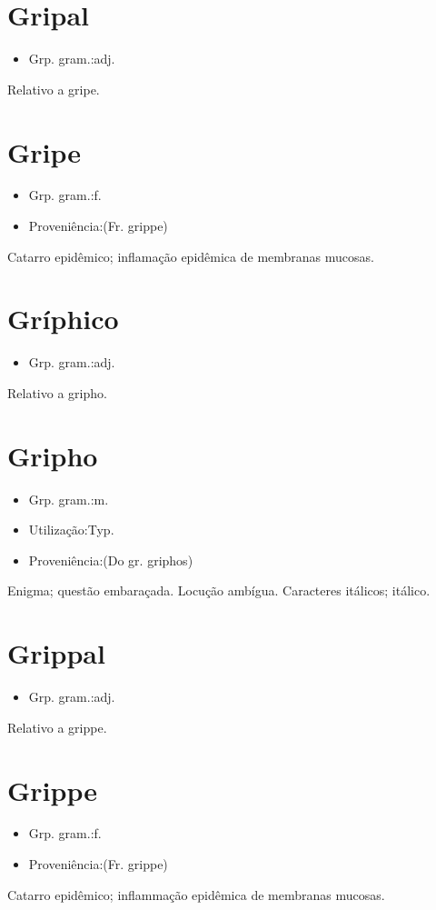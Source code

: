 \section{Gripal}
\begin{itemize}
\item {Grp. gram.:adj.}
\end{itemize}
Relativo a gripe.
\section{Gripe}
\begin{itemize}
\item {Grp. gram.:f.}
\end{itemize}
\begin{itemize}
\item {Proveniência:(Fr. \textunderscore grippe\textunderscore )}
\end{itemize}
Catarro epidêmico; inflamação epidêmica de membranas mucosas.
\section{Gríphico}
\begin{itemize}
\item {Grp. gram.:adj.}
\end{itemize}
Relativo a gripho.
\section{Gripho}
\begin{itemize}
\item {Grp. gram.:m.}
\end{itemize}
\begin{itemize}
\item {Utilização:Typ.}
\end{itemize}
\begin{itemize}
\item {Proveniência:(Do gr. \textunderscore griphos\textunderscore )}
\end{itemize}
Enigma; questão embaraçada.
Locução ambígua.
Caracteres itálicos; itálico.
\section{Grippal}
\begin{itemize}
\item {Grp. gram.:adj.}
\end{itemize}
Relativo a grippe.
\section{Grippe}
\begin{itemize}
\item {Grp. gram.:f.}
\end{itemize}
\begin{itemize}
\item {Proveniência:(Fr. \textunderscore grippe\textunderscore )}
\end{itemize}
Catarro epidêmico; inflammação epidêmica de membranas mucosas.
